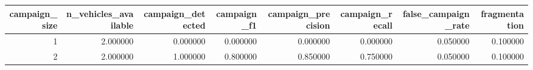 \begin{tabular}{rrrrrrrr}
\toprule
campaign_size & n_vehicles_available & campaign_detected & campaign_f1 & campaign_precision & campaign_recall & false_campaign_rate & fragmentation \\
\midrule
1 & 2.000000 & 0.000000 & 0.000000 & 0.000000 & 0.000000 & 0.050000 & 0.100000 \\
2 & 2.000000 & 1.000000 & 0.800000 & 0.850000 & 0.750000 & 0.050000 & 0.100000 \\
\bottomrule
\end{tabular}
